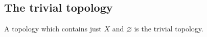 
\subsection{The trivial topology}

A topology which contains just \(X\) and \(\varnothing \) is the trivial topology.

